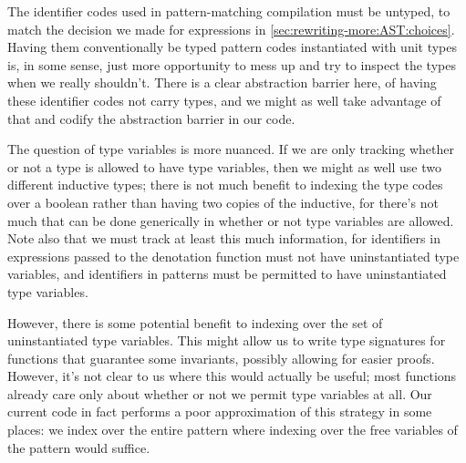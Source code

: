 The identifier codes used in pattern-matching compilation must be untyped, to match the decision we made for expressions in \autoref{sec:rewriting-more:AST:choices}.
Having them conventionally be typed pattern codes instantiated with unit types is, in some sense, just more opportunity to mess up and try to inspect the types when we really shouldn't.
There is a clear abstraction barrier here, of having these identifier codes not carry types, and we might as well take advantage of that and codify the abstraction barrier in our code.

The question of type variables is more nuanced.
If we are only tracking whether or not a type is allowed to have type variables, then we might as well use two different inductive types; there is not much benefit to indexing the type codes over a boolean rather than having two copies of the inductive, for there's not much that can be done generically in whether or not type variables are allowed.
Note also that we must track at least this much information, for identifiers in expressions passed to the denotation function must not have uninstantiated type variables, and identifiers in patterns must be permitted to have uninstantiated type variables.

However, there is some potential benefit to indexing over the set of uninstantiated type variables.
This might allow us to write type signatures for functions that guarantee some invariants, possibly allowing for easier proofs.
However, it's not clear to us where this would actually be useful; most functions already care only about whether or not we permit type variables at all.
Our current code in fact performs a poor approximation of this strategy in some places: we index over the entire pattern where indexing over the free variables of the pattern would suffice.

